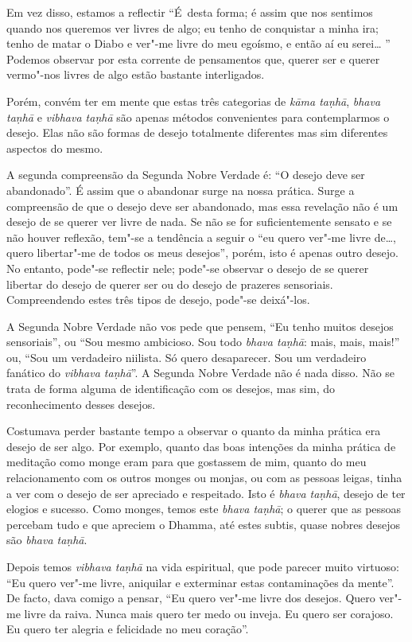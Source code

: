 Em vez disso, estamos a reflectir “É~desta forma; é assim
que nos sentimos quando nos queremos ver livres de algo; eu tenho de conquistar
a minha ira; tenho de matar o Diabo e ver"-me livre do meu egoísmo, e então aí eu
serei\ldots{} ” Podemos observar por esta corrente de pensamentos que, querer ser e
querer vermo"-nos livres de algo estão bastante interligados.

Porém, convém ter em mente que estas três categorias de \emph{kāma taṇhā},
\emph{bhava taṇhā} e \emph{vibhava taṇhā} são apenas métodos convenientes para
contemplarmos o desejo. Elas não são formas de desejo totalmente diferentes mas
sim diferentes aspectos do mesmo.

A segunda compreensão da Segunda Nobre Verdade é: “O desejo deve ser abandonado”.
É assim que o abandonar surge na nossa prática. Surge a compreensão de que o
desejo deve ser abandonado, mas essa revelação não é um desejo de se querer ver
livre de nada. Se não se for suficientemente sensato e se não houver reflexão,
tem"-se a tendência a seguir o “eu quero ver"-me livre de\ldots{}, quero
libertar"-me de todos os meus desejos”, porém, isto é apenas outro desejo. No
entanto, pode"-se reflectir nele; pode"-se observar o desejo de se querer libertar
do desejo de querer ser ou do desejo de prazeres sensoriais. Compreendendo estes
três tipos de desejo, pode"-se deixá"-los.

A Segunda Nobre Verdade não vos pede que pensem, “Eu tenho muitos desejos
sensoriais”, ou “Sou mesmo ambicioso. Sou todo \emph{bhava taṇhā}: mais, mais,
mais!” ou, “Sou um verdadeiro niilista. Só quero desaparecer. Sou um verdadeiro
fanático do \emph{vibhava taṇhā}”. A Segunda Nobre Verdade não é nada disso. Não
se trata de forma alguma de identificação com os desejos, mas sim, do
reconhecimento desses desejos.

Costumava perder bastante tempo a observar o quanto da minha prática era desejo
de ser algo. Por exemplo, quanto das boas intenções da minha prática de
meditação como monge eram para que gostassem de mim, quanto do meu
relacionamento com os outros monges ou monjas, ou com as pessoas leigas, tinha a
ver com o desejo de ser apreciado e respeitado. Isto é \emph{bhava taṇhā},
desejo de ter elogios e sucesso. Como monges, temos este \emph{bhava taṇhā}; o
querer que as pessoas percebam tudo e que apreciem o Dhamma, até estes subtis,
quase nobres desejos são \emph{bhava taṇhā}.

Depois temos \emph{vibhava taṇhā} na vida espiritual, que pode parecer muito
virtuoso: “Eu quero ver"-me livre, aniquilar e exterminar estas contaminações da
mente”. De facto, dava comigo a pensar, “Eu quero ver"-me livre dos desejos.
Quero ver"-me livre da raiva. Nunca mais quero ter medo ou inveja. Eu quero ser
corajoso. Eu quero ter alegria e felicidade no meu coração”.

